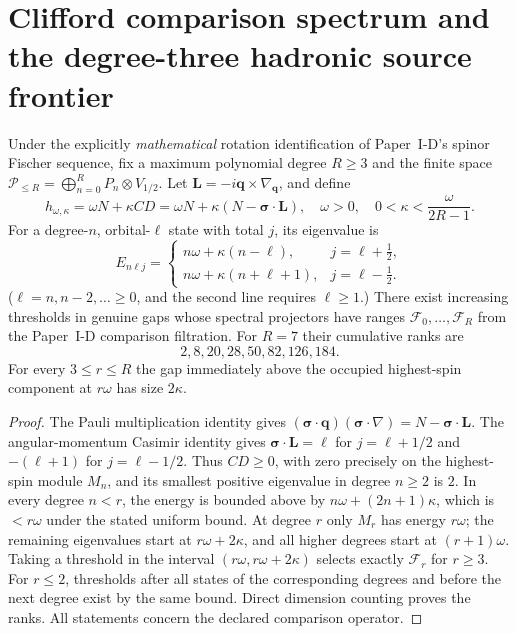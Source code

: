 \documentclass[12pt,a4paper]{article}
\begin{document}
\section{Clifford comparison spectrum and the degree-three hadronic source frontier}
\label{p12:sec:v357-clifford-shell-certificate}
\begin{theorem}
\label{p12:thm:v357-clifford-shell-spectrum}
Under the explicitly \emph{mathematical} rotation identification of
Paper~I-D's spinor Fischer sequence, fix a maximum polynomial degree
$R\ge3$ and the finite space
$\mathscr P_{\le R}=\bigoplus_{n=0}^R P_n\otimes V_{1/2}$.
Let $\mathbf L=-i\mathbf q\times\nabla_{\mathbf q}$, and define
\[
 h_{\omega,\kappa}=\omega N+\kappa CD
 =\omega N+\kappa(N-\boldsymbol\sigma\cdot\mathbf L),
 \quad \omega>0,\quad 0<\kappa<\frac{\omega}{2R-1}.
\]
For a degree-$n$, orbital-$\ell$ state with total $j$, its eigenvalue is
\[
 E_{n\ell j}=\begin{cases}
 n\omega+\kappa(n-\ell),&j=\ell+\frac12,\\
 n\omega+\kappa(n+\ell+1),&j=\ell-\frac12.
 \end{cases}
\]
($\ell=n,n-2,\ldots\ge0$, and the second line requires $\ell\ge1$.)
There exist increasing thresholds in genuine gaps whose spectral
projectors have ranges $\mathscr F_0,\ldots,\mathscr F_R$ from the
Paper~I-D comparison filtration. For $R=7$ their cumulative ranks are
\[
 \boxed{2,8,20,28,50,82,126,184.}
\]
For every $3\le r\le R$ the gap immediately above the occupied
highest-spin component at $r\omega$ has size $2\kappa$.
\end{theorem}
\begin{proof}
The Pauli multiplication identity gives
$(\boldsymbol\sigma\cdot\mathbf q)
(\boldsymbol\sigma\cdot\nabla)=N-\boldsymbol\sigma\cdot\mathbf L$.
The angular-momentum Casimir identity gives
$\boldsymbol\sigma\cdot\mathbf L=\ell$ for
$j=\ell+1/2$ and $-(\ell+1)$ for $j=\ell-1/2$.
Thus $CD\ge0$, with zero precisely on the highest-spin module
$M_n$, and its smallest positive eigenvalue in degree $n\ge2$
is $2$. In every degree $n<r$, the energy is bounded above by
$n\omega+(2n+1)\kappa$, which is $<r\omega$ under the stated
uniform bound. At degree $r$ only $M_r$ has energy $r\omega$;
the remaining eigenvalues start at $r\omega+2\kappa$, and all
higher degrees start at $(r+1)\omega$. Taking a threshold in
the interval $(r\omega,r\omega+2\kappa)$ selects exactly
$\mathscr F_r$ for $r\ge3$. For $r\le2$, thresholds after all
states of the corresponding degrees and before the next degree
exist by the same bound. Direct dimension counting proves the
ranks. All statements concern the declared comparison operator.
\end{proof}
\end{document}
